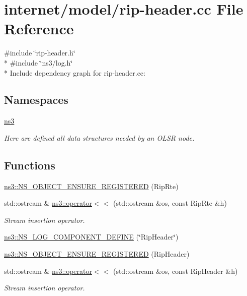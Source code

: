 \hypertarget{rip-header_8cc}{}\section{internet/model/rip-\/header.cc File Reference}
\label{rip-header_8cc}
{\ttfamily \#include \char`\"{}rip-\/header.\+h\char`\"{}}\\*
{\ttfamily \#include \char`\"{}ns3/log.\+h\char`\"{}}\\*
Include dependency graph for rip-\/header.cc\+:
\subsection*{Namespaces}
\begin{DoxyCompactItemize}
\item 
 \hyperlink{namespacens3}{ns3}
\begin{DoxyCompactList}\small\item\em Here are defined all data structures needed by an O\+L\+SR node. \end{DoxyCompactList}\end{DoxyCompactItemize}
\subsection*{Functions}
\begin{DoxyCompactItemize}
\item 
\hyperlink{namespacens3_a8a90bb44a40d07aae125e09cd05a5ba4}{ns3\+::\+N\+S\+\_\+\+O\+B\+J\+E\+C\+T\+\_\+\+E\+N\+S\+U\+R\+E\+\_\+\+R\+E\+G\+I\+S\+T\+E\+R\+ED} (Rip\+Rte)
\item 
std\+::ostream \& \hyperlink{namespacens3_a701b08070ee0aca7658ed2c083bc71bc}{ns3\+::operator$<$$<$} (std\+::ostream \&os, const Rip\+Rte \&h)
\begin{DoxyCompactList}\small\item\em Stream insertion operator. \end{DoxyCompactList}\item 
\hyperlink{namespacens3_a4bd321fdacdb5382348ca27d3565bad0}{ns3\+::\+N\+S\+\_\+\+L\+O\+G\+\_\+\+C\+O\+M\+P\+O\+N\+E\+N\+T\+\_\+\+D\+E\+F\+I\+NE} (\char`\"{}Rip\+Header\char`\"{})
\item 
\hyperlink{namespacens3_a89c8feaf0d9dc96ffc19520f86f44aa5}{ns3\+::\+N\+S\+\_\+\+O\+B\+J\+E\+C\+T\+\_\+\+E\+N\+S\+U\+R\+E\+\_\+\+R\+E\+G\+I\+S\+T\+E\+R\+ED} (Rip\+Header)
\item 
std\+::ostream \& \hyperlink{namespacens3_aaf537f7624cfcbe056d3ebc47019b1d1}{ns3\+::operator$<$$<$} (std\+::ostream \&os, const Rip\+Header \&h)
\begin{DoxyCompactList}\small\item\em Stream insertion operator. \end{DoxyCompactList}\end{DoxyCompactItemize}
